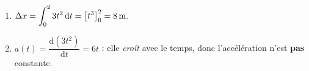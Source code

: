 \documentclass[11pt,a4paper]{article}
\begin{document}
\begin{corrige}
\begin{enumerate}[label=\alph*)]
  \item $\displaystyle \Delta x=\int_0^2 3t^2\,\mathrm{d}t=\big[t^3\big]_0^2=\qty{8}{\metre}$.
  \item $a(t)=\dfrac{\mathrm{d}(3t^2)}{\mathrm{d}t}=6t$ : elle \emph{croît} avec le temps, donc l'accélération n'est \textbf{pas} constante.
\end{enumerate}
\end{corrige}
\end{document}
